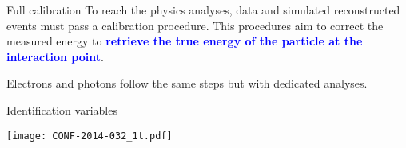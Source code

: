 \begin{frame}{Full calibration}
  To reach the physics analyses, data and simulated reconstructed events must pass a calibration procedure.
  This procedures aim to correct the measured energy to \textcolor{blue}{\bf retrieve the true energy of the particle at the interaction point}.
  \begin{center}
  \end{center}
  Electrons and photons follow the same steps but with dedicated analyses. 
\end{frame}

\begin{frame}{Identification variables}
  \begin{center}
\texttt{[image: CONF-2014-032\_1t.pdf]}
\end{center}
\end{frame}

